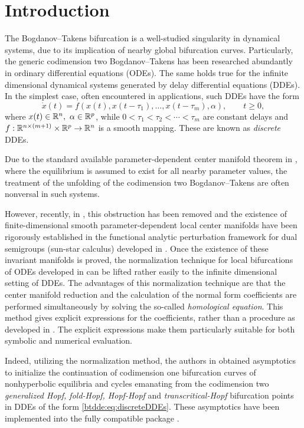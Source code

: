 \section{Introduction} 
The Bogdanov--Takens bifurcation is a well-studied singularity in dynamical
systems, due to its implication of nearby global bifurcation curves.
Particularly, the generic codimension two Bogdanov--Takens has been researched
abundantly in ordinary differential equations (ODEs). The same holds true for
the infinite dimensional dynamical systems generated by delay differential
equations (DDEs). In the simplest case, often encountered in applications, such
DDEs have the form
%
\begin{equation}
    \label{btdde:eq:discreteDDEs} 
    \dot{x}(t) = f(x(t),x(t-\tau_1),\ldots,x(t-\tau_m),\alpha),
    \qquad t \geq 0,
\end{equation}
%
where $x(t) \in \mathbb{R}^n,\ \alpha \in \mathbb{R}^p$, while $0 < \tau_1 < \tau_2 < \cdots
<\tau_m$ are constant delays and $f : \mathbb{R}^{n \times (m + 1)} \times \mathbb{R}^p \to
\mathbb{R}^n$ is a smooth mapping. These are known as \emph{discrete} DDEs.

Due to the standard available parameter-dependent center manifold theorem in
\cite{diekmann1995delay}, where the equilibrium is assumed to exist for all
nearby parameter values, the treatment of the unfolding of the codimension two
Bogdanov--Takens are often nonversal in such systems.

However, recently, in \cite{Switching2019}, this obstruction has been removed
and the existence of finite-dimensional smooth parameter-dependent local center
manifolds have been rigorously established in the functional analytic
perturbation framework for dual semigroups (sun-star calculus) developed
in \cite{Clement1987, Clement1988, Clement1989, Clement1989b}. Once the
existence of these invariant manifolds is proved, the normalization
technique for local bifurcations of ODEs developed in \cite{Kuznetsov1999} can
be lifted rather easily to the infinite dimensional setting of DDEs. The
advantages of this normalization technique are that the center manifold
reduction and the calculation of the normal form coefficients are performed
simultaneously by solving the so-called \emph{homological equation}. This
method gives explicit expressions for the coefficients, rather than a procedure
as developed in \cite{Faria1995201, Faria1995}. The explicit expressions make
them particularly suitable for both symbolic and numerical evaluation.

Indeed, utilizing the normalization method, the authors in \cite{Switching2019}
obtained asymptotics to initialize the continuation of codimension one
bifurcation curves of nonhyperbolic equilibria and cycles emanating from the
codimension two \emph{generalized Hopf, fold-Hopf, Hopf-Hopf} and
\emph{transcritical-Hopf} bifurcation points in DDEs of the form \cref{btdde:eq:discreteDDEs}.
These asymptotics have been implemented into the fully \OCTAVE compatible
\MATLAB package \DDEBIFTOOL \cite{DDEBIFTOOL,2014arXiv1406.7144S}. 

